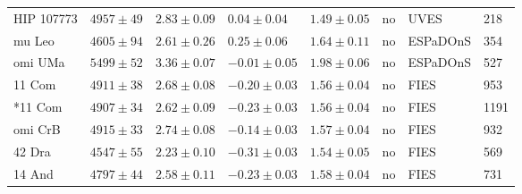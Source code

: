 \documentclass{aa}
\begin{document}
\begin{table}[htb!]
\begin{tabular}{llllllll}
   HIP 107773     &  $4957 \pm  49$      &  $2.83 \pm 0.09$    &  $ 0.04 \pm 0.04$    &  $1.49 \pm 0.05$             &             no              & UVES         &  218  \\  %
       mu Leo     &  $4605 \pm  94$      &  $2.61 \pm 0.26$    &  $ 0.25 \pm 0.06$    &  $1.64 \pm 0.11$             &             no              & ESPaDOnS     &  354  \\  %
      omi UMa     &  $5499 \pm  52$      &  $3.36 \pm 0.07$    &  $-0.01 \pm 0.05$    &  $1.98 \pm 0.06$             &             no              & ESPaDOnS     &  527  \\  %
       11 Com     &  $4911 \pm  38$      &  $2.68 \pm 0.08$    &  $-0.20 \pm 0.03$    &  $1.56 \pm 0.04$             &             no              & FIES         &  953  \\  %
      *11 Com     &  $4907 \pm  34$      &  $2.62 \pm 0.09$	   &  $-0.23 \pm 0.03$    &  $1.56 \pm 0.04$             &             no              & FIES         & 1191  \\
      omi CrB     &  $4915 \pm  33$      &  $2.74 \pm 0.08$    &  $-0.14 \pm 0.03$    &  $1.57 \pm 0.04$             &             no              & FIES         &  932  \\  %
       42 Dra     &  $4547 \pm  55$      &  $2.23 \pm 0.10$    &  $-0.31 \pm 0.03$    &  $1.54 \pm 0.05$             &             no              & FIES         &  569  \\  %
       14 And     &  $4797 \pm  44$      &  $2.58 \pm 0.11$    &  $-0.23 \pm 0.03$    &  $1.58 \pm 0.04$             &             no              & FIES         &  731  \\  %

\end{tabular}
\end{table}
\end{document}
